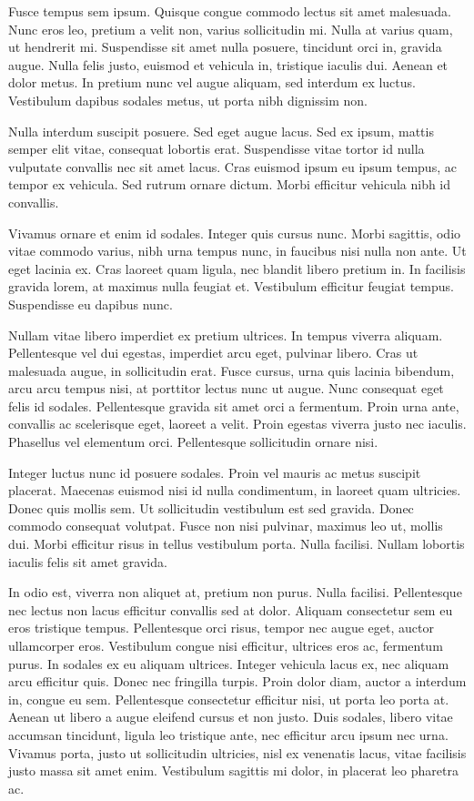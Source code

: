 \documentclass[pdftex, brazil, 12pt, twoside]{article}
\begin{document}
Fusce tempus sem ipsum. Quisque congue commodo lectus sit amet malesuada. Nunc eros leo, pretium a velit non, varius sollicitudin mi. Nulla at varius quam, ut hendrerit mi. Suspendisse sit amet nulla posuere, tincidunt orci in, gravida augue. Nulla felis justo, euismod et vehicula in, tristique iaculis dui. Aenean et dolor metus. In pretium nunc vel augue aliquam, sed interdum ex luctus. Vestibulum dapibus sodales metus, ut porta nibh dignissim non.

Nulla interdum suscipit posuere. Sed eget augue lacus. Sed ex ipsum, mattis semper elit vitae, consequat lobortis erat. Suspendisse vitae tortor id nulla vulputate convallis nec sit amet lacus. Cras euismod ipsum eu ipsum tempus, ac tempor ex vehicula. Sed rutrum ornare dictum. Morbi efficitur vehicula nibh id convallis.

Vivamus ornare et enim id sodales. Integer quis cursus nunc. Morbi sagittis, odio vitae commodo varius, nibh urna tempus nunc, in faucibus nisi nulla non ante. Ut eget lacinia ex. Cras laoreet quam ligula, nec blandit libero pretium in. In facilisis gravida lorem, at maximus nulla feugiat et. Vestibulum efficitur feugiat tempus. Suspendisse eu dapibus nunc.

Nullam vitae libero imperdiet ex pretium ultrices. In tempus viverra aliquam. Pellentesque vel dui egestas, imperdiet arcu eget, pulvinar libero. Cras ut malesuada augue, in sollicitudin erat. Fusce cursus, urna quis lacinia bibendum, arcu arcu tempus nisi, at porttitor lectus nunc ut augue. Nunc consequat eget felis id sodales. Pellentesque gravida sit amet orci a fermentum. Proin urna ante, convallis ac scelerisque eget, laoreet a velit. Proin egestas viverra justo nec iaculis. Phasellus vel elementum orci. Pellentesque sollicitudin ornare nisi.

Integer luctus nunc id posuere sodales. Proin vel mauris ac metus suscipit placerat. Maecenas euismod nisi id nulla condimentum, in laoreet quam ultricies. Donec quis mollis sem. Ut sollicitudin vestibulum est sed gravida. Donec commodo consequat volutpat. Fusce non nisi pulvinar, maximus leo ut, mollis dui. Morbi efficitur risus in tellus vestibulum porta. Nulla facilisi. Nullam lobortis iaculis felis sit amet gravida.

In odio est, viverra non aliquet at, pretium non purus. Nulla facilisi. Pellentesque nec lectus non lacus efficitur convallis sed at dolor. Aliquam consectetur sem eu eros tristique tempus. Pellentesque orci risus, tempor nec augue eget, auctor ullamcorper eros. Vestibulum congue nisi efficitur, ultrices eros ac, fermentum purus. In sodales ex eu aliquam ultrices. Integer vehicula lacus ex, nec aliquam arcu efficitur quis. Donec nec fringilla turpis. Proin dolor diam, auctor a interdum in, congue eu sem. Pellentesque consectetur efficitur nisi, ut porta leo porta at. Aenean ut libero a augue eleifend cursus et non justo. Duis sodales, libero vitae accumsan tincidunt, ligula leo tristique ante, nec efficitur arcu ipsum nec urna. Vivamus porta, justo ut sollicitudin ultricies, nisl ex venenatis lacus, vitae facilisis justo massa sit amet enim. Vestibulum sagittis mi dolor, in placerat leo pharetra ac.
\end{document}
